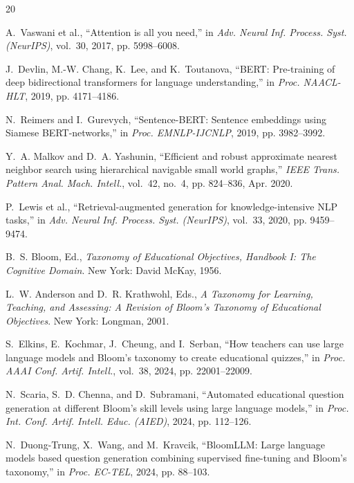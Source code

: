 \documentclass[conference]{IEEEtran}
\begin{document}
\begin{thebibliography}{20}

A.~Vaswani et al., ``Attention is all you need,'' in \emph{Adv. Neural Inf. Process. Syst. (NeurIPS)}, vol.~30, 2017, pp. 5998--6008.

J.~Devlin, M.-W. Chang, K.~Lee, and K.~Toutanova, ``BERT: Pre-training of deep bidirectional transformers for language understanding,'' in \emph{Proc. NAACL-HLT}, 2019, pp. 4171--4186.

N.~Reimers and I.~Gurevych, ``Sentence-BERT: Sentence embeddings using Siamese BERT-networks,'' in \emph{Proc. EMNLP-IJCNLP}, 2019, pp. 3982--3992.

Y.~A. Malkov and D.~A. Yashunin, ``Efficient and robust approximate nearest neighbor search using hierarchical navigable small world graphs,'' \emph{IEEE Trans. Pattern Anal. Mach. Intell.}, vol.~42, no.~4, pp. 824--836, Apr. 2020.

P.~Lewis et al., ``Retrieval-augmented generation for knowledge-intensive NLP tasks,'' in \emph{Adv. Neural Inf. Process. Syst. (NeurIPS)}, vol.~33, 2020, pp. 9459--9474.

B.~S. Bloom, Ed., \emph{Taxonomy of Educational Objectives, Handbook I: The Cognitive Domain}. New York: David McKay, 1956.

L.~W. Anderson and D.~R. Krathwohl, Eds., \emph{A Taxonomy for Learning, Teaching, and Assessing: A Revision of Bloom's Taxonomy of Educational Objectives}. New York: Longman, 2001.

S.~Elkins, E.~Kochmar, J.~Cheung, and I.~Serban, ``How teachers can use large language models and Bloom's taxonomy to create educational quizzes,'' in \emph{Proc. AAAI Conf. Artif. Intell.}, vol.~38, 2024, pp. 22001--22009.

N.~Scaria, S.~D. Chenna, and D.~Subramani, ``Automated educational question generation at different Bloom's skill levels using large language models,'' in \emph{Proc. Int. Conf. Artif. Intell. Educ. (AIED)}, 2024, pp. 112--126.

N.~Duong-Trung, X.~Wang, and M.~Kravcik, ``BloomLLM: Large language models based question generation combining supervised fine-tuning and Bloom's taxonomy,'' in \emph{Proc. EC-TEL}, 2024, pp. 88--103.


\end{thebibliography}
\end{document}
